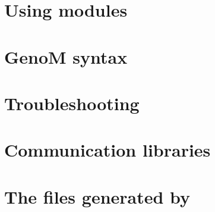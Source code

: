 \documentclass[a4paper,11pt]{book}
\begin{document}
\chapter{Using modules}
\label{cha|using}


\chapter{GenoM syntax}
\label{cha|syntax}



\appendix

\chapter{Troubleshooting}
\label{anx|troubles}


\chapter{Communication libraries}
\label{anx|posters}


\chapter[The files generated by GenoM]{The files generated by \GenoM}
\label{anx|files}


\end{document}

